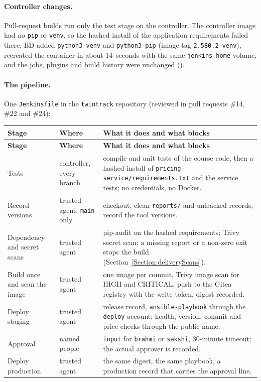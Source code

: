 \paragraph{Controller changes.} Pull-request builds run only the test stage on the controller. The controller image had no \texttt{pip} or \texttt{venv}, so the hashed install of the
application requirements failed there; BD added \texttt{python3-venv} and \texttt{python3-pip} (image tag \texttt{2.580.2-venv}), recreated the container in about 14~seconds with the
same \texttt{jenkins\_home} volume, and the jobs, plugins and build history were unchanged ().

\paragraph{The pipeline.} One \texttt{Jenkinsfile} in the \texttt{twintrack} repository (reviewed in pull requests \#14, \#22 and \#24):
\begin{tabularx}{\linewidth}{L{3.6cm}L{2.7cm}Y}
\caption{Stages of the delivery pipeline\label{Table:DeliveryStages}}\\
\toprule \textbf{Stage} & \textbf{Where} & \textbf{What it does and what blocks}\\ \midrule
\endfirsthead
\toprule \textbf{Stage} & \textbf{Where} & \textbf{What it does and what blocks}\\ \midrule
\endhead \bottomrule \endlastfoot
Tests & controller, every branch & compile and unit tests of the course code, then a hashed install of \texttt{pricing-service/requirements.txt} and the service tests; no credentials, no Docker.\\
Record versions & trusted agent, \texttt{main} only & checkout, clean \texttt{reports/} and untracked records, record the tool versions.\\
Dependency and secret scans & trusted agent & pip-audit on the hashed requirements; Trivy secret scan; a missing report or a non-zero exit stops the build (Section~\ref{Section:deliveryScans}).\\
Build once and scan the image & trusted agent & one image per commit, Trivy image scan for HIGH and CRITICAL, push to the Gitea registry with the write token, digest recorded.\\
Deploy staging & trusted agent & release record, \texttt{ansible-playbook} through the \texttt{deploy} account; health, version, commit and price checks through the public name.\\
Approval & named people & \texttt{input} for \texttt{brahmi} or \texttt{sakshi}, 30-minute timeout; the actual approver is recorded.\\
Deploy production & trusted agent & the same digest, the same playbook, a production record that carries the approval line.\\
\end{tabularx}

